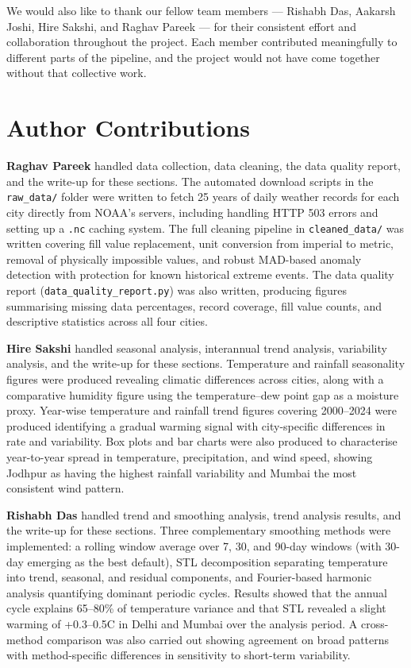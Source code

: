 We would also like to thank our fellow team members --- Rishabh Das, 
Aakarsh Joshi, Hire Sakshi, and Raghav Pareek --- for their consistent 
effort and collaboration throughout the project. Each member contributed 
meaningfully to different parts of the pipeline, and the project would 
not have come together without that collective work.
\section{Author Contributions}

\textbf{Raghav Pareek} handled data collection, data cleaning, the data 
quality report, and the write-up for these sections. The automated download 
scripts in the \texttt{raw\_data/} folder were written to fetch 25 years of 
daily weather records for each city directly from NOAA's servers, including 
handling HTTP 503 errors and setting up a \texttt{.nc} caching system. The 
full cleaning pipeline in \texttt{cleaned\_data/} was written covering fill 
value replacement, unit conversion from imperial to metric, removal of 
physically impossible values, and robust MAD-based anomaly detection with 
protection for known historical extreme events. The data quality report 
(\texttt{data\_quality\_report.py}) was also written, producing figures 
summarising missing data percentages, record coverage, fill value counts, 
and descriptive statistics across all four cities.

\textbf{Hire Sakshi} handled seasonal analysis, interannual trend analysis, 
variability analysis, and the write-up for these sections. Temperature and 
rainfall seasonality figures were produced revealing climatic differences 
across cities, along with a comparative humidity figure using the 
temperature--dew point gap as a moisture proxy. Year-wise temperature and 
rainfall trend figures covering 2000--2024 were produced identifying a 
gradual warming signal with city-specific differences in rate and variability. 
Box plots and bar charts were also produced to characterise year-to-year 
spread in temperature, precipitation, and wind speed, showing Jodhpur as 
having the highest rainfall variability and Mumbai the most consistent wind 
pattern.

\textbf{Rishabh Das} handled trend and smoothing analysis, trend analysis 
results, and the write-up for these sections. Three complementary smoothing 
methods were implemented: a rolling window average over 7, 30, and 90-day 
windows (with 30-day emerging as the best default), STL decomposition 
separating temperature into trend, seasonal, and residual components, and 
Fourier-based harmonic analysis quantifying dominant periodic cycles. Results 
showed that the annual cycle explains 65--80\% of temperature variance and 
that STL revealed a slight warming of +0.3--0.5\textdegree C in Delhi and 
Mumbai over the analysis period. A cross-method comparison was also carried 
out showing agreement on broad patterns with method-specific differences in 
sensitivity to short-term variability.

